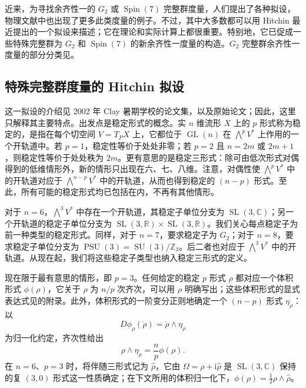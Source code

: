 近来，为寻找余齐性一的 $G_2$ 或 $\operatorname{Spin}(7)$ 完整群度量，人们提出了各种拟设，物理文献中也出现了更多此类度量的例子。不过，其中大多数都可以用 Hitchin 最近提出的一个拟设来描述；它在理论和实际计算上都很重要。特别地，它已促成一些特殊完整群为 $G_2$ 和 $\operatorname{Spin}(7)$ 的新余齐性一度量的构造。$G_2$ 完整群余齐性一度量的部分分类见。

\subsection{特殊完整群度量的 Hitchin 拟设}\label{sec:7.1.5}

这一拟设的介绍见 2002 年 Clay 暑期学校的论文集，以及原始论文；因此，这里只解释其主要特点。出发点是稳定形式的概念。实 $n$ 维流形 $X$ 上的 $p$ 形式称为稳定的，是指在每个切空间 $V=T_PX$ 上，它都位于 $\operatorname{GL}(n)$ 在 $\bigwedge^pV^*$ 上作用的一个开轨道中。若 $p=1$，稳定性等价于处处非零；若 $p=2$ 且 $n=2m$ 或 $2m+1$，则稳定性等价于处处秩为 $2m$。更有意思的是稳定三形式：除可由低次形式对偶得到的低维情形外，新的情形只出现在六、七、八维。注意，对偶性使 $\bigwedge^pV^*$ 中的开轨道对应于 $\bigwedge^{n-p}V^*$ 中的开轨道，从而也得到稳定的 $(n-p)$ 形式。至此，所有可能的稳定形式均已包括在内，不再有其他情形。

对于 $n=6$，$\bigwedge^3V^*$ 中存在一个开轨道，其稳定子单位分支为 $\operatorname{SL}(3,\mathbb C)$；另一个开轨道的稳定子单位分支为 $\operatorname{SL}(3,\mathbb R)\times\operatorname{SL}(3,\mathbb R)$。我们关心每点稳定子为前一种类型的稳定形式。同样，对于 $n=7$，要求稳定子为 $G_2$；对于 $n=8$，要求稳定子单位分支为 $\operatorname{PSU}(3)=\operatorname{SU}(3)/\mathbb Z_3$。后二者也对应于 $\bigwedge^3V^*$ 中的开轨道。从现在起，我们将这些稳定子类型也纳入稳定三形式的定义。

现在限于最有意思的情形，即 $p=3$。任何给定的稳定 $p$ 形式 $\rho$ 都对应一个体积形式 $\phi(\rho)$，它关于 $\rho$ 为 $n/p$ 次齐次，可以用 $\rho$ 明确写出；这些体积形式的显式表达式见的附录。此外，体积形式的一阶变分正则地确定一个 $(n-p)$ 形式 $\eta_\rho$：以
\[
D\phi_\rho(\dot\rho)=\dot\rho\wedge\eta_\rho
\]
为归一化约定，齐次性给出
\[
\rho\wedge\eta_\rho=\frac np\phi(\rho).
\]
在 $n=6$、$p=3$ 时，将伴随三形式记为 $\widehat\rho$，它由 $\Omega=\rho+\mathrm i\widehat\rho$ 是 $\operatorname{SL}(3,\mathbb C)$ 保持的复 $(3,0)$ 形式这一性质确定；在下文所用的体积归一化下，$\phi(\rho)=\tfrac12\rho\wedge\widehat\rho$。

